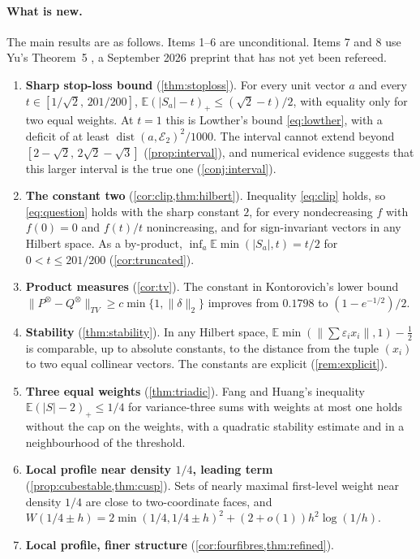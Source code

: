 \documentclass[11pt,a4paper]{article}
\numberwithin{equation}{section}
\theoremstyle{remark}
\newcommand{\E}{\mathbb E}
\newcommand{\dist}{\operatorname{dist}}
\begin{document}
\paragraph{What is new.}
The main results are as follows. Items 1--6 are unconditional.
Items 7 and 8 use Yu's Theorem~5 \cite{YuLevel}, a September 2026 preprint
that has not yet been refereed.
\begin{enumerate}[leftmargin=2em]
\item \textbf{Sharp stop-loss bound} (\cref{thm:stoploss}). For every unit
 vector $a$ and every $t\in[1/\sqrt2,\,201/200]$,
 $\E(|S_a|-t)_+\le(\sqrt2-t)/2$, with equality only for two equal weights.
 At $t=1$ this is Lowther's bound \eqref{eq:lowther}, with a deficit of at
 least $\dist(a,\mathcal E_2)^2/1000$. The interval cannot extend beyond
 $[2-\sqrt2,\,2\sqrt2-\sqrt3]$ (\cref{prop:interval}), and numerical
 evidence suggests that this larger interval is the true one
 (\cref{conj:interval}).
\item \textbf{The constant two} (\cref{cor:clip,thm:hilbert}). Inequality
 \eqref{eq:clip} holds, so \eqref{eq:question} holds with the sharp
 constant $2$, for every nondecreasing $f$ with $f(0)=0$ and $f(t)/t$
 nonincreasing, and for sign-invariant vectors in any Hilbert space. As a
 by-product, $\inf_a\E\min(|S_a|,t)=t/2$ for $0<t\le201/200$
 (\cref{cor:truncated}).
\item \textbf{Product measures} (\cref{cor:tv}). The constant in Kontorovich's
 lower bound $\|P^{\otimes}-Q^{\otimes}\|_{TV}\ge c\min\{1,\|\delta\|_2\}$
 improves from $0.1798$ to $(1-e^{-1/2})/2$.
\item \textbf{Stability} (\cref{thm:stability}). In any Hilbert space,
 $\E\min(\|\sum\varepsilon_ix_i\|,1)-\tfrac12$ is comparable, up to
 absolute constants, to the distance from the tuple $(x_i)$ to two equal
 collinear vectors. The constants are explicit (\cref{rem:explicit}).
\item \textbf{Three equal weights} (\cref{thm:triadic}). Fang and Huang's
 inequality $\E(|S|-2)_+\le1/4$ for variance-three sums with weights at most
 one \cite[Lemma~2.4]{FangHuang} holds without the cap on the weights, with
 a quadratic stability estimate and in a neighbourhood of the threshold.
\item \textbf{Local profile near density $1/4$, leading term}
 (\cref{prop:cubestable,thm:cusp}). Sets of nearly maximal first-level weight
 near density $1/4$ are close to two-coordinate faces, and
 $W(1/4\pm h)=2\min(1/4,1/4\pm h)^2+(2+o(1))h^2\log(1/h)$.
\item \textbf{Local profile, finer structure} (\cref{cor:fourfibres,thm:refined}).

\end{enumerate}
\end{document}
